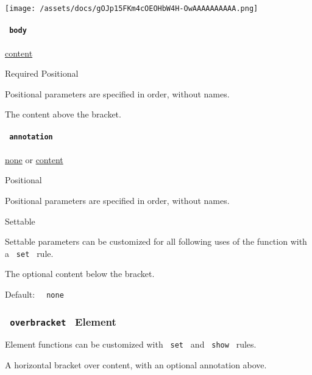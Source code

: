 \texttt{[image: /assets/docs/gOJp15FKm4cOEOHbW4H-OwAAAAAAAAAA.png]}

\paragraph{\texorpdfstring{\texttt{\ body\ }}{ body }}\label{functions-underbracket-body}

\href{/docs/reference/foundations/content/}{content}

{Required} {{ Positional }}

\label{functions-underbracket-body-positional-tooltip}
Positional parameters are specified in order, without names.

The content above the bracket.

\paragraph{\texorpdfstring{\texttt{\ annotation\ }}{ annotation }}\label{functions-underbracket-annotation}

\href{/docs/reference/foundations/none/}{none} {or}
\href{/docs/reference/foundations/content/}{content}

{{ Positional }}

\label{functions-underbracket-annotation-positional-tooltip}
Positional parameters are specified in order, without names.

{{ Settable }}

\label{functions-underbracket-annotation-settable-tooltip}
Settable parameters can be customized for all following uses of the
function with a \texttt{\ set\ } rule.

The optional content below the bracket.

Default: \texttt{\ }{\texttt{\ none\ }}\texttt{\ }

\subsubsection{\texorpdfstring{\texttt{\ overbracket\ } {{ Element
}}}{ overbracket   Element }}\label{functions-overbracket}

\label{functions-overbracket-element-tooltip}
Element functions can be customized with \texttt{\ set\ } and
\texttt{\ show\ } rules.

A horizontal bracket over content, with an optional annotation above.

